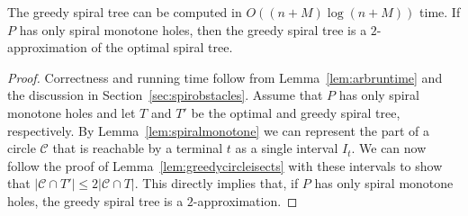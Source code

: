 \documentclass{journalA4}
\begin{document}
\begin{theorem}
\label{theo:greedy}
The greedy spiral tree can be computed in $O((n+M) \log(n+M))$ time. If $P$ has only spiral monotone holes, then the greedy spiral tree is a $2$-approximation of the optimal spiral tree.
\end{theorem}
\begin{proof}
Correctness and running time follow from Lemma~\ref{lem:arbruntime} and the discussion in Section~\ref{sec:spirobstacles}.
Assume that $P$ has only spiral monotone holes and let $T$ and $T'$ be the optimal and greedy spiral tree, respectively. By Lemma~\ref{lem:spiralmonotone} we can represent the part of a circle $\mathcal{C}$ that is reachable by a terminal $t$ as a single interval $I_t$. We can now follow the proof of Lemma~\ref{lem:greedycircleisects} with these intervals to show that $|\mathcal{C} \cap T'| \leq 2 |\mathcal{C} \cap T|$. This directly implies that, if $P$ has only spiral monotone holes, the greedy spiral tree is a $2$-approximation.
\end{proof}
\end{document}
